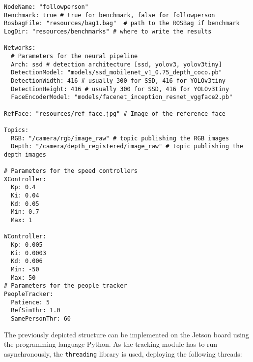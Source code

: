 \begin{lstlisting}
NodeName: "followperson"
Benchmark: true # true for benchmark, false for followperson
RosbagFile: "resources/bag1.bag"  # path to the ROSBag if benchmark 
LogDir: "resources/benchmarks" # where to write the results

Networks:
  # Parameters for the neural pipeline
  Arch: ssd # detection architecture [ssd, yolov3, yolov3tiny]
  DetectionModel: "models/ssd_mobilenet_v1_0.75_depth_coco.pb"
  DetectionWidth: 416 # usually 300 for SSD, 416 for YOLOv3tiny
  DetectionHeight: 416 # usually 300 for SSD, 416 for YOLOv3tiny
  FaceEncoderModel: "models/facenet_inception_resnet_vggface2.pb"

RefFace: "resources/ref_face.jpg" # Image of the reference face

Topics:
  RGB: "/camera/rgb/image_raw" # topic publishing the RGB images
  Depth: "/camera/depth_registered/image_raw" # topic publishing the depth images

# Parameters for the speed controllers
XController:
  Kp: 0.4
  Ki: 0.04
  Kd: 0.05
  Min: 0.7
  Max: 1

WController:
  Kp: 0.005
  Ki: 0.0003
  Kd: 0.006
  Min: -50
  Max: 50
# Parameters for the people tracker
PeopleTracker:
  Patience: 5
  RefSimThr: 1.0
  SamePersonThr: 60
\end{lstlisting}


The previously depicted structure can be implemented on the Jetson board using the programming language Python. As the tracking module has to run asynchronously, the \texttt{threading} library is used, deploying the following threads:


